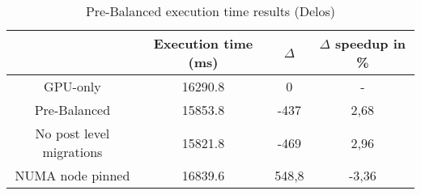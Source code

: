 \begin{table}[H]
  \centering
  \begin{tabular}{||c | c | c | c||} 
   \hline
    & Execution time (ms) & $\Delta$ & $\Delta$ speedup in \% \\ [0.5ex] 
   \hline\hline
   GPU-only & 16290.8 & 0 & - \\
   Pre-Balanced & 15853.8 & -437 & 2,68 \\ 
   No post level migrations & 15821.8 & -469 & 2,96 \\
   NUMA node pinned & 16839.6 & 548,8 & -3,36 \\ [1ex] 
   \hline
  \end{tabular}
  \caption{Pre-Balanced execution time results (Delos)}
  \label{table:preb_delos}
\end{table}